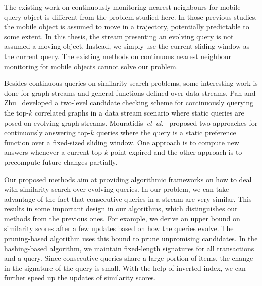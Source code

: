 The existing work on continuously monitoring nearest neighbours for mobile query object is different from the problem studied here. In those previous studies, the mobile object is assumed to move in a trajectory, potentially predictable to some extent.  In this thesis, the stream presenting an evolving query is not assumed a moving object.  Instead, we simply use the current sliding window as the current query.  The existing methods on continuous nearest neighbour monitoring for mobile objects cannot solve our problem.

Besides continuous queries on similarity search problems, some interesting work is done for graph streams and general functions defined over data streams. Pan and Zhu~\cite{PZ12} developed a two-level candidate checking scheme for continuously querying the top-$k$ correlated graphs in a data stream scenario where static queries are posed on evolving graph streams. Mouratidis~\textit{et~al.}~\cite{DBLP:conf/sigmod/MouratidisBP06} proposed two approaches for continuously answering top-$k$ queries where the query is a static preference function over a fixed-sized sliding window. One approach is to compute new answers whenever a current top-$k$ point expired and the other approach is to precompute future changes partially. 

Our proposed methods aim at providing algorithmic frameworks on how to deal with similarity search over evolving queries.  In our problem, we can take advantage of the fact that consecutive queries in a stream are very similar.  This results in some important design in our algorithms, which distinguishes our methods from the previous ones.  For example, we derive an upper bound on similarity scores after a few updates based on how the queries evolve.  The pruning-based algorithm uses this bound to prune unpromising candidates.  In the hashing-based algorithm, we maintain fixed-length signatures for all transactions and a query.  Since consecutive queries share a large portion of items, the change in the signature of the query is small.  With the help of inverted index, we can further speed up the updates of similarity scores.      

